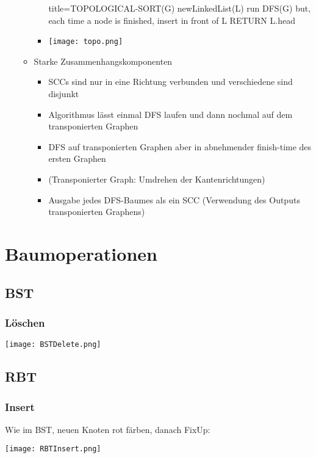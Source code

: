 \begin{itemize}
\begin{itemize}
\begin{itemize}
                \begin{ccode}[autogobble]{title={TOPOLOGICAL-SORT(G)}}
                    newLinkedList(L)
                    run DFS(G) but, each time a node is finished, insert in front of L
                    RETURN L.head
                \end{ccode}
            \item[] \centerline{\texttt{[image: topo.png]}}
        \end{itemize}
    \item Starke Zusammenhangskomponenten
        \begin{itemize}
            \item SCCs sind nur in eine Richtung verbunden und verschiedene sind disjunkt
            \item Algorithmus lässt einmal DFS laufen und dann nochmal auf dem transponierten Graphen
            \item DFS auf transponierten Graphen aber in abnehmender finish-time des ersten Graphen
            \item[] (Transponierter Graph: Umdrehen der Kantenrichtungen)
            \item Ausgabe jedes DFS-Baumes als ein SCC (Verwendung des Outputs transponierten Graphens)
        \end{itemize}
\end{itemize}
\end{itemize}

\section*{Baumoperationen}

\subsection*{BST}
\subsubsection*{Löschen}
\centerline{\texttt{[image: BSTDelete.png]}}

\subsection*{RBT}
\subsubsection*{Insert}
\centerline{Wie im BST, neuen Knoten rot färben, danach FixUp:}
\centerline{\texttt{[image: RBTInsert.png]}}

